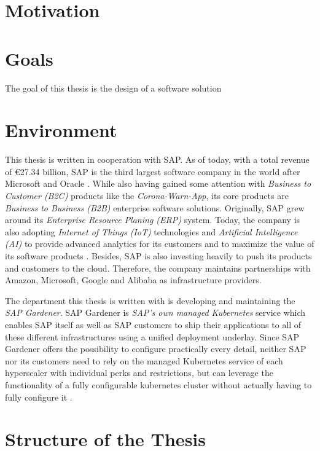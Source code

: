

\section{Motivation}
\section{Goals}
The goal of this thesis is the design of a software solution 
\section{Environment}
This thesis is written in cooperation with SAP. As of today, with a total revenue of €27.34 billion, SAP is the third largest software company in the world after Microsoft and Oracle \cite{LargestSoftwareCompanies}. While also having gained some attention with \textit{Business to Customer (B2C)} products like the \textit{Corona-Warn-App}, its core products are \textit{Business to Business (B2B)} enterprise software solutions. Originally, SAP grew around its \textit{Enterprise Resource Planing (ERP)} system. Today, the company is also adopting \textit{Internet of Things (IoT)} technologies and \textit{Artificial Intelligence (AI)} to provide advanced analytics for its customers and to maximize the value of its software products \cite{AboutSAP}. Besides, SAP is also investing heavily to push its products and customers to the cloud. Therefore, the company maintains partnerships with Amazon, Microsoft, Google and Alibaba as infrastructure providers.\par 
The department this thesis is written with is developing and maintaining the \textit{SAP Gardener}. SAP Gardener is \textit{SAP's own managed Kubernetes} service which enables SAP itself as well as SAP customers to ship their applications to all of these different infrastructures using a unified deployment underlay. Since SAP Gardener offers the possibility to configure practically every detail, neither SAP nor its customers need to rely on the managed Kubernetes service of each hyperscaler with individual perks and restrictions, but can leverage the functionality of a fully configurable kubernetes cluster without actually having to fully configure it \cite{GardenerValueProposition}. 
   
\section{Structure of the Thesis}


